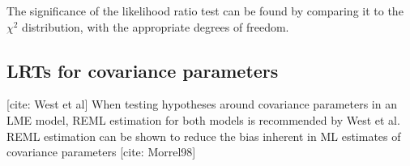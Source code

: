 The significance of the likelihood ratio test can be found by comparing it to the  $\chi^2$ distribution, with the appropriate degrees of freedom.

\subsection{LRTs for covariance parameters}
[cite: West et al] When testing hypotheses around covariance parameters in an LME model, REML estimation for both models is recommended by West et al. REML estimation can be shown to reduce the bias inherent in ML estimates of covariance parameters [cite: Morrel98]



